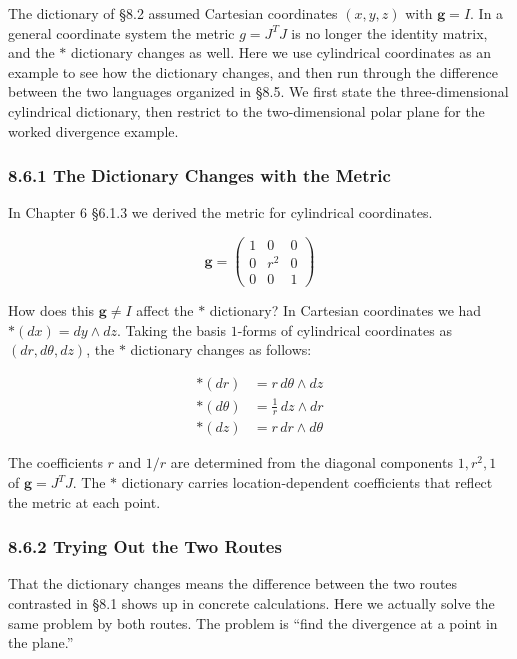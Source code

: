\documentclass[a4paper,12pt,openany]{book}
\begin{document}
The dictionary of §8.2 assumed Cartesian coordinates \((x,y,z)\) with
\(\mathbf{g}=I\). In a general coordinate system the metric
\(g = J^T J\) is no longer the identity matrix, and the \(\ast\)
dictionary changes as well. Here we use cylindrical coordinates as an
example to see how the dictionary changes, and then run through the
difference between the two languages organized in §8.5. We first state
the three-dimensional cylindrical dictionary, then restrict to the
two-dimensional polar plane for the worked divergence example.

\hypertarget{the-dictionary-changes-with-the-metric}{%
\subsubsection{8.6.1 The Dictionary Changes with the
Metric}\label{the-dictionary-changes-with-the-metric}}

In Chapter 6 §6.1.3 we derived the metric for cylindrical coordinates.

\[\mathbf{g} = \begin{pmatrix} 1 & 0 & 0 \\ 0 & r^2 & 0 \\ 0 & 0 & 1 \end{pmatrix}\]

How does this \(\mathbf{g} \neq I\) affect the \(\ast\) dictionary? In
Cartesian coordinates we had \(\ast(dx) = dy \wedge dz\). Taking the
basis \(1\)-forms of cylindrical coordinates as \((dr, d\theta, dz)\),
the \(\ast\) dictionary changes as follows:

\[\begin{aligned}
\ast(dr) &= r\,d\theta \wedge dz \\
\ast(d\theta) &= \frac{1}{r}\,dz \wedge dr \\
\ast(dz) &= r\,dr \wedge d\theta
\end{aligned}\]

The coefficients \(r\) and \(1/r\) are determined from the diagonal
components \(1, r^2, 1\) of \(\mathbf{g} = J^T J\). The \(\ast\)
dictionary carries location-dependent coefficients that reflect the
metric at each point.

\hypertarget{trying-out-the-two-routes}{%
\subsubsection{8.6.2 Trying Out the Two
Routes}\label{trying-out-the-two-routes}}

That the dictionary changes means the difference between the two routes
contrasted in §8.1 shows up in concrete calculations. Here we actually
solve the same problem by both routes. The problem is ``find the
divergence at a point in the plane.''
\end{document}
